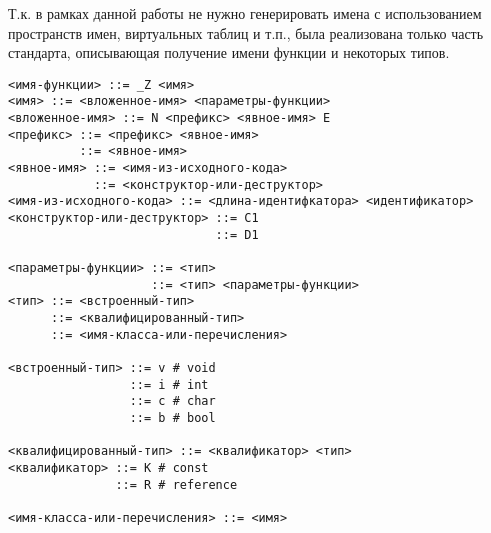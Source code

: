 Т.к. в рамках данной работы не нужно генерировать имена с использованием
пространств имен, виртуальных таблиц и т.п., была реализована только часть
стандарта, описывающая получение имени функции и некоторых типов.

\begin{verbatim}
<имя-функции> ::= _Z <имя>
<имя> ::= <вложенное-имя> <параметры-функции>
<вложенное-имя> ::= N <префикс> <явное-имя> E
<префикс> ::= <префикс> <явное-имя>
          ::= <явное-имя>
<явное-имя> ::= <имя-из-исходного-кода>
            ::= <конструктор-или-деструктор>
<имя-из-исходного-кода> ::= <длина-идентифкатора> <идентификатор>
<конструктор-или-деструктор> ::= С1
                             ::= D1

<параметры-функции> ::= <тип>
                    ::= <тип> <параметры-функции>
<тип> ::= <встроенный-тип>
      ::= <квалифицированный-тип>
      ::= <имя-класса-или-перечисления>

<встроенный-тип> ::= v # void
                 ::= i # int
                 ::= c # char
                 ::= b # bool

<квалифицированный-тип> ::= <квалификатор> <тип>
<квалификатор> ::= K # const
               ::= R # reference

<имя-класса-или-перечисления> ::= <имя>
\end{verbatim}

